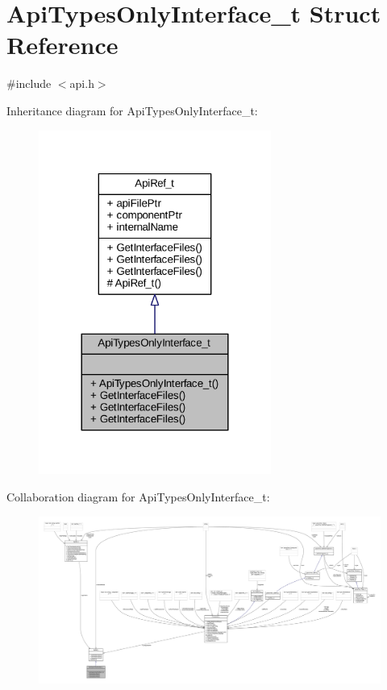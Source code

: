 \hypertarget{struct_api_types_only_interface__t}{}\section{Api\+Types\+Only\+Interface\+\_\+t Struct Reference}
\label{struct_api_types_only_interface__t}


{\ttfamily \#include $<$api.\+h$>$}



Inheritance diagram for Api\+Types\+Only\+Interface\+\_\+t\+:
\nopagebreak
\begin{figure}[H]
\begin{center}
\leavevmode
\includegraphics[width=216pt]{struct_api_types_only_interface__t__inherit__graph}
\end{center}
\end{figure}


Collaboration diagram for Api\+Types\+Only\+Interface\+\_\+t\+:
\nopagebreak
\begin{figure}[H]
\begin{center}
\leavevmode
\includegraphics[width=350pt]{struct_api_types_only_interface__t__coll__graph}
\end{center}
\end{figure}
